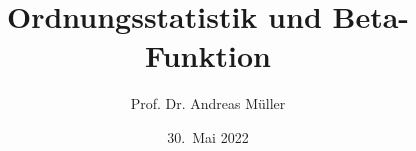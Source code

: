 %
%
%


\beamertemplatenavigationsymbolsempty
\title[Ordnungsstatistik]{Ordnungsstatistik und Beta-Funktion}
\author[A.~Müller]{Prof. Dr. Andreas Müller}
\date[]{30.~Mai 2022}

